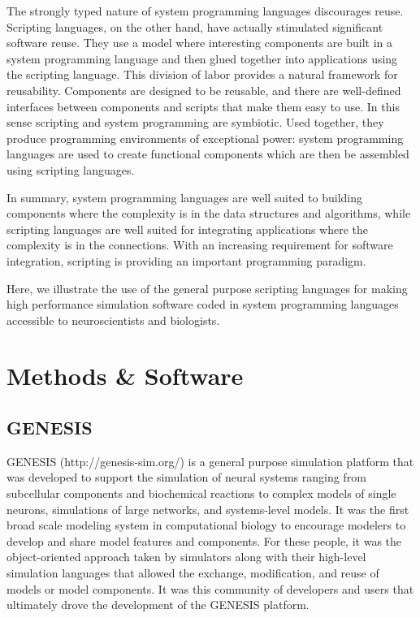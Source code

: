\documentclass[12pt]{article}
\begin{document}
The strongly typed nature of system programming languages discourages
reuse. Scripting languages, on the other hand, have actually
stimulated significant software reuse. They use a model where
interesting components are built in a system programming language and
then glued together into applications using the scripting language.
This division of labor provides a natural framework for reusability.
Components are designed to be reusable, and there are well-defined
interfaces between components and scripts that make them easy to use.
In this sense scripting and system programming are symbiotic. Used
together, they produce programming environments of exceptional power:
system programming languages are used to create functional components
which are then be assembled using scripting languages.

In summary, system programming languages are well suited to building
components where the complexity is in the data structures and
algorithms, while scripting languages are well suited for integrating
applications where the complexity is in the connections. With an
increasing requirement for software integration, scripting is
providing an important programming paradigm.

Here, we illustrate the use of the general purpose scripting languages
for making high performance simulation software coded in system
programming languages accessible to neuroscientists and biologists.




\section{Methods \& Software}

\subsection{GENESIS}

GENESIS (http://genesis-sim.org/) is a general purpose
simulation platform that was developed to support the simulation of
neural systems ranging from subcellular components and biochemical
reactions to complex models of single neurons, simulations of large
networks, and systems-level models. It was the first broad scale
modeling system in computational biology to encourage modelers to
develop and share model features and components. For these people, it
was the object-oriented approach taken by simulators along with their
high-level simulation languages that allowed the exchange,
modification, and reuse of models or model components. It was this
community of developers and users that ultimately drove the
development of the GENESIS platform.
\end{document}
